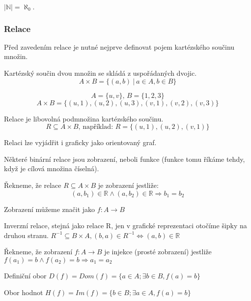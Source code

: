 \begin{definition}
    $|\mathbb{N}|=\aleph_0$.
\end{definition}

\subsubsection*{Relace}
Před zavedením relace je nutné nejprve definovat pojem kartézského součinu množin.
\begin{definition} 
	Kartézský součin dvou množin se skládá z uspořádaných dvojic.
	$$A \times B = \{(a, b)\: | \: a \in A, b \in B\}$$
\end{definition}
\begin{example}
    \[A = \{u, v\}
	\textrm{, }
	B = \{1, 2, 3\}\]
	$$A \times B = \{(u, 1), (u, 2), (u, 3), (v, 1), (v, 2), (v, 3)\}$$
\end{example}

\begin{definition}[Relace]
    Relace je libovolná podmnožina kartézského součinu.
    $$R \subseteq A \times B \textrm{, například: } R = \{(u, 1), (u, 2), (v, 1)\}$$
\end{definition}

Relaci lze vyjádřit i graficky jako orientovaný graf.

Některé binární relace jsou zobrazení, neboli funkce (funkce tomu říkáme tehdy, když je cílová
množina číselná).

\begin{definition}[Zobrazení]
	Řekneme, že relace $R \subseteq A \times B$ je zobrazení jestliže:
	$$(a, b_1) \in \mathbb{R} \wedge (a, b_2) \in \mathbb{R} \Rightarrow b_1 = b_2$$
\end{definition}

Zobrazení můžeme značit jako $f: A \rightarrow B$


Inverzní relace, stejná jako relace R, jen v grafické reprezentaci otočíme šipky na druhou stranu.
$R^{-1} \subseteq B \times A,  (b, a) \in R^{-1} \Leftrightarrow (a, b) \in \mathbb{R}$

Řekneme, že zobrazení $f: A \rightarrow B$ je injekce (prosté zobrazení)
jestliže $f(a_1) = b \wedge f(a_2) = b \Rightarrow a_1 = a_2$

Definiční obor $D(f) = Dom(f) = \{a \in A; \exists b \in B, f(a) = b\}$

Obor hodnot $H(f) = Im(f) = \{b \in B; \exists a \in A, f(a) = b\}$

